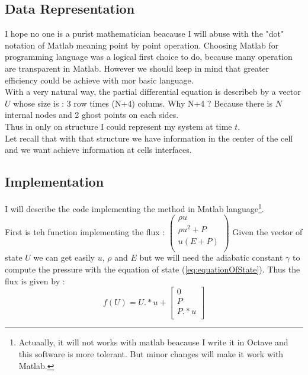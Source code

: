 \documentclass[a4paper,12pt]{article}
\begin{document}
\subsection{Data Representation}
I hope no one is a purist mathematician beacause I will abuse with the "dot" notation of Matlab meaning point by point operation. Choosing Matlab for programming language was a logical first choice to do, because many operation are transparent in Matlab. However we should keep in mind that greater efficiency could be achieve with mor basic language. \\
With a very natural way, the partial differential equation is describeb by a vector $U$ whose size is : 3 row times (N+4) colums. Why N+4 ? Because there is $N$ internal nodes and 2 ghost points on each sides. \\
Thus in only on structure I could represent my system at time $t$.\\

Let recall that with that structure we have information in the center of the cell and we want achieve information at cells interfaces.
 
\subsection{Implementation}
I will describe the code implementing the method in Matlab language\footnote{Actuaally, it will not works with matlab beacause I write it in Octave and this software is more tolerant. But minor changes will make it work with Matlab.}.\\
First is teh function implementing the flux : $\begin{pmatrix}
\rho u\\
\rho u^2+P\\
u(E+P)\\
\end{pmatrix}$ Given the vector of state $U$ we can get easily $u$, $\rho$ and $E$ but we will need the adiabatic constant $\gamma$ to compute the pressure with the equation of state (\ref{eq:equationOfState}). Thus the flux is given by : 
$$
f(U) = U.*u + \begin{bmatrix}
0\\
P\\
P.*u\\
\end{bmatrix}
$$



\end{document}
